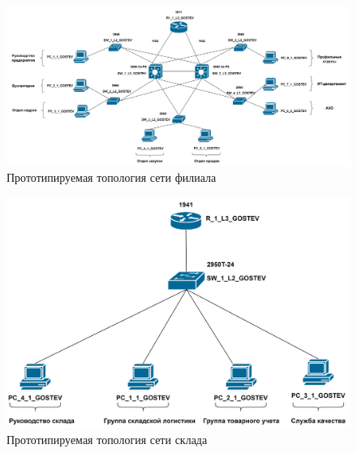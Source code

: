 \documentclass[14pt, a4paper]{extarticle}
\numberwithin{equation}{section}
\begin{document}
\begin{landscape}
\begin{figure}[H]
        \centering
        \includegraphics[scale=0.2]{topo_filial.png}
        \caption{Прототипируемая топология сети филиала}
        \label{fig:filialTopo}
\end{figure}
\end{landscape}

\begin{figure}[H]
        \centering
        \includegraphics[scale=0.2]{topo_warehouse.png}
        \caption{Прототипируемая топология сети склада}
        \label{fig:warehouseTopo}
\end{figure}
\end{document}
